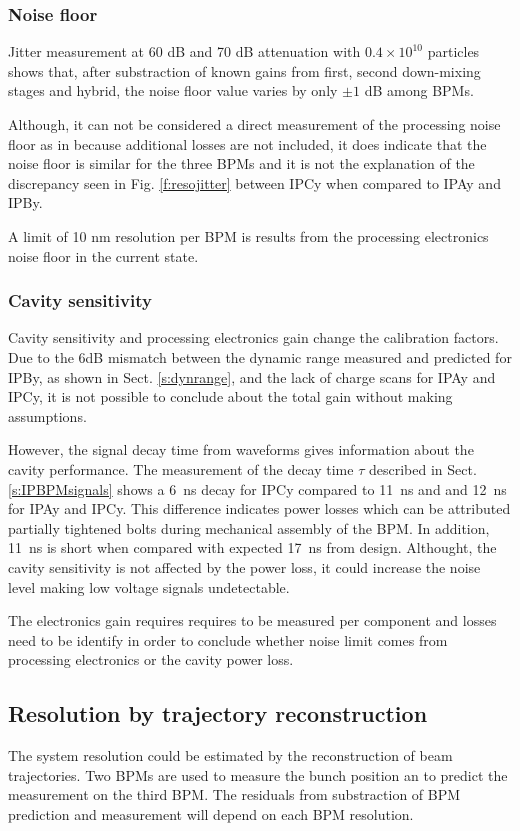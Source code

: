 \subsubsection{Noise floor}
Jitter measurement at 60 dB and 70 dB attenuation with $0.4\times10^{10}$ particles shows that, after substraction of known gains from first, second down-mixing stages and hybrid, the noise floor value varies by only $\pm1$ dB among BPMs.\par
Although, it can not be considered a direct measurement of the processing noise floor as in \cite{PhysRevSTAB.11.062801} because additional losses are not included, it does indicate that the noise floor is similar for the three BPMs and it is not the explanation of the discrepancy seen in Fig. \ref{f:resojitter} between IPCy when compared to IPAy and IPBy.\par
A limit of 10 nm resolution per BPM is results from the processing electronics noise floor in the current state.\par

\subsubsection{Cavity sensitivity}\label{s:resosensi}
Cavity sensitivity and processing electronics gain change the calibration factors. Due to the 6dB mismatch between the dynamic range measured and predicted for IPBy, as shown in Sect. \ref{s:dynrange}, and the lack of charge scans for IPAy and IPCy, it is not possible to conclude about the total gain without making assumptions.\par
However, the signal decay time from waveforms gives information about the cavity performance. The measurement of the decay time $\tau$ described in Sect. \ref{s:IPBPMsignals} shows a 6~ns decay for IPCy compared to 11~ns and and 12~ns for IPAy and IPCy. This difference indicates power losses which can be attributed partially tightened bolts during mechanical assembly of the BPM. In addition, 11~ns is short when compared with expected 17~ns from design. Althought, the cavity sensitivity is not affected by the power loss, it could increase the noise level making low voltage signals undetectable.\par
The electronics gain requires requires to be measured per component and losses need to be identify in order to conclude whether noise limit comes from processing electronics or the cavity power loss.

\subsection{Resolution by trajectory reconstruction}
The system resolution could be estimated by the reconstruction of beam trajectories. Two BPMs are used to measure the bunch position an to predict the measurement on the third BPM. The residuals from substraction of BPM prediction and measurement will depend on each BPM resolution.\par
